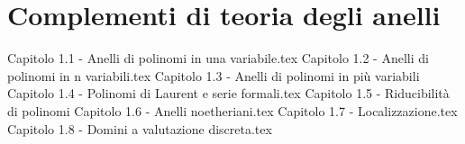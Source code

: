 \documentclass{article}
\begin{document}
\setcounter{page}{1}
\section{Complementi di teoria degli anelli}
{Capitolo 1.1 - Anelli di polinomi in una variabile.tex}
{Capitolo 1.2 - Anelli di polinomi in n variabili.tex}
{Capitolo 1.3 - Anelli di polinomi in più variabili}
{Capitolo 1.4 - Polinomi di Laurent e serie formali.tex}
{Capitolo 1.5 - Riducibilità di polinomi}
{Capitolo 1.6 - Anelli noetheriani.tex}
{Capitolo 1.7 - Localizzazione.tex}
{Capitolo 1.8 - Domini a valutazione discreta.tex}
\end{document}
